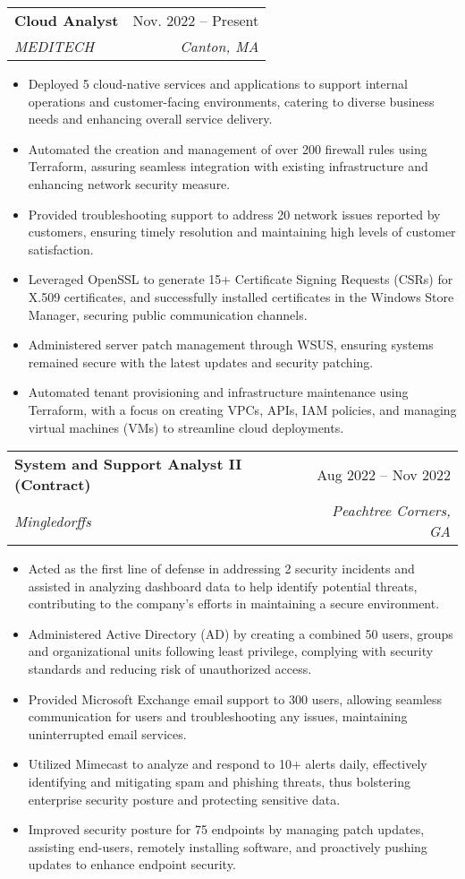 \documentclass[letterpaper,10pt]{article}
\makeatletter
\newcommand{\resumeItem}[1]{
  \item\small{
    {#1 \vspace{-2pt}}
  }
}
\newcommand{\resumeSubheading}[4]{
  \vspace{-2pt}\item
    \begin{tabular*}{0.97\textwidth}[t]{l@{\extracolsep{\fill}}r}
      \textbf{#1} & #2 \\
      \textit{\small#3} & \textit{\small #4} \\
    \end{tabular*}\vspace{-7pt}
}
\newcommand{\resumeItemListStart}{\begin{itemize}}
\newcommand{\resumeItemListEnd}{\end{itemize}\vspace{-5pt}}
\makeatother
\begin{document}
    \resumeSubheading
      {Cloud Analyst}{Nov. 2022 -- Present}
      {MEDITECH}{Canton, MA}
      \resumeItemListStart
        \resumeItem{Deployed 5 cloud-native services and applications to support internal operations and customer-facing environments, catering to diverse business needs and enhancing overall service delivery.}
        \resumeItem{Automated the creation and management of over 200 firewall rules using Terraform, assuring seamless integration with existing infrastructure and enhancing network security measure.}
        \resumeItem{Provided troubleshooting support to address 20 network issues reported by customers, ensuring timely resolution and maintaining high levels of customer satisfaction.}
        \resumeItem{Leveraged OpenSSL to generate 15+ Certificate Signing Requests (CSRs) for X.509 certificates, and successfully installed certificates in the Windows Store Manager, securing public communication channels.}
        \resumeItem{Administered server patch management through WSUS, ensuring systems remained secure with the latest updates and security patching.}
        \resumeItem{Automated tenant provisioning and infrastructure maintenance using Terraform, with a focus on creating VPCs, APIs, IAM policies, and managing virtual machines (VMs) to streamline cloud deployments.}
    \resumeItemListEnd

    \resumeSubheading
      {System and Support Analyst II (Contract)}{Aug 2022 -- Nov 2022}
      {Mingledorffs}{Peachtree Corners, GA}
      \resumeItemListStart
        \resumeItem{Acted as the first line of defense in addressing 2 security incidents and assisted in analyzing dashboard data to help identify potential threats, contributing to the company's efforts in maintaining a secure environment.}
        \resumeItem{Administered Active Directory (AD) by creating a combined 50 users, groups and organizational units following least privilege, complying with security standards and reducing risk of unauthorized access.}
        \resumeItem{Provided Microsoft Exchange email support to 300 users, allowing seamless communication for users and troubleshooting any issues, maintaining uninterrupted email services.}
        \resumeItem{Utilized Mimecast to analyze and respond to 10+ alerts daily, effectively identifying and mitigating spam and phishing threats, thus bolstering enterprise security posture and protecting sensitive data.}
        \resumeItem{Improved security posture for 75 endpoints by managing patch updates, assisting end-users, remotely installing software, and proactively pushing updates to enhance endpoint security.} 
    \resumeItemListEnd
\end{document}
